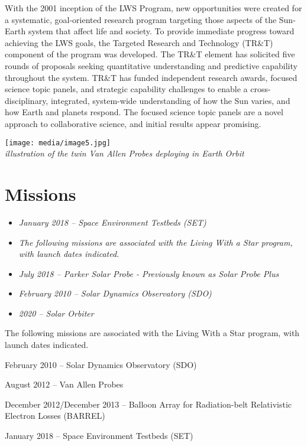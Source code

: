 With the 2001 inception of the LWS Program, new opportunities were
created for a systematic, goal-oriented research program targeting those
aspects of the Sun-Earth system that affect life and society. To provide
immediate progress toward achieving the LWS goals, the Targeted Research
and Technology (TR\&T) component of the program was developed. The TR\&T
element has solicited five rounds of proposals seeking quantitative
understanding and predictive capability throughout the system. TR\&T has
funded independent research awards, focused science topic panels, and
strategic capability challenges to enable a cross-disciplinary,
integrated, system-wide understanding of how the Sun varies, and how
Earth and planets respond. The focused science topic panels are a novel
approach to collaborative science, and initial results appear promising.

\texttt{[image: media/image5.jpg]}\\
\emph{illustration of the twin Van Allen Probes deploying in Earth
Orbit}

\section{Missions}\label{missions}

\begin{itemize}
\item
  \emph{January 2018 -- Space Environment Testbeds (SET)}
\item
  \emph{The following missions are associated with the Living With a
  Star program, with launch dates indicated.}
\item
  \emph{July 2018 -- Parker Solar Probe - Previously known as Solar
  Probe Plus}
\item
  \emph{February 2010 -- Solar Dynamics Observatory (SDO)}
\item
  \emph{2020 -- Solar Orbiter}
\end{itemize}

The following missions are associated with the Living With a Star
program, with launch dates indicated.

February 2010 -- Solar Dynamics Observatory (SDO)

August 2012 -- Van Allen Probes

December 2012/December 2013 -- Balloon Array for Radiation-belt
Relativistic Electron Losses (BARREL)

January 2018 -- Space Environment Testbeds (SET)

